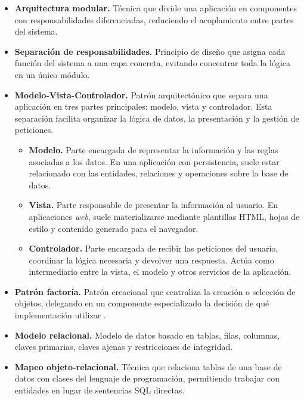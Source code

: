 \begin{itemize}
	\item \textbf{Arquitectura modular.} Técnica que divide una aplicación en componentes con responsabilidades diferenciadas, reduciendo el acoplamiento entre partes del sistema.
	
	\item \textbf{Separación de responsabilidades.} Principio de diseño que asigna cada función del sistema a una capa concreta, evitando concentrar toda la lógica en un único módulo.
	
	\item \textbf{Modelo-Vista-Controlador.} Patrón arquitectónico que separa una aplicación en tres partes principales: modelo, vista y controlador. Esta separación facilita organizar la lógica de datos, la presentación y la gestión de peticiones.
	
	\begin{itemize}
	
		\item \textbf{Modelo.} Parte encargada de representar la información y las reglas asociadas a los datos. En una aplicación con persistencia, suele estar relacionado con las entidades, relaciones y operaciones sobre la base de datos.
		
		\item \textbf{Vista.} Parte responsable de presentar la información al usuario. En aplicaciones \textit{web}, suele materializarse mediante plantillas HTML, hojas de estilo y contenido generado para el navegador.
		
		\item \textbf{Controlador.} Parte encargada de recibir las peticiones del usuario, coordinar la lógica necesaria y devolver una respuesta. Actúa como intermediario entre la vista, el modelo y otros servicios de la aplicación.
	\end{itemize}
	
	\item \textbf{Patrón factoría.} Patrón creacional que centraliza la creación o selección de objetos, delegando en un componente especializado la decisión de qué implementación utilizar \cite{gamma1994design}.
	
	\item \textbf{Modelo relacional.} Modelo de datos basado en tablas, filas, columnas, claves primarias, claves ajenas y restricciones de integridad.
	
	\item \textbf{Mapeo objeto-relacional.} Técnica que relaciona tablas de una base de datos con clases del lenguaje de programación, permitiendo trabajar con entidades en lugar de sentencias SQL directas.
\end{itemize}

